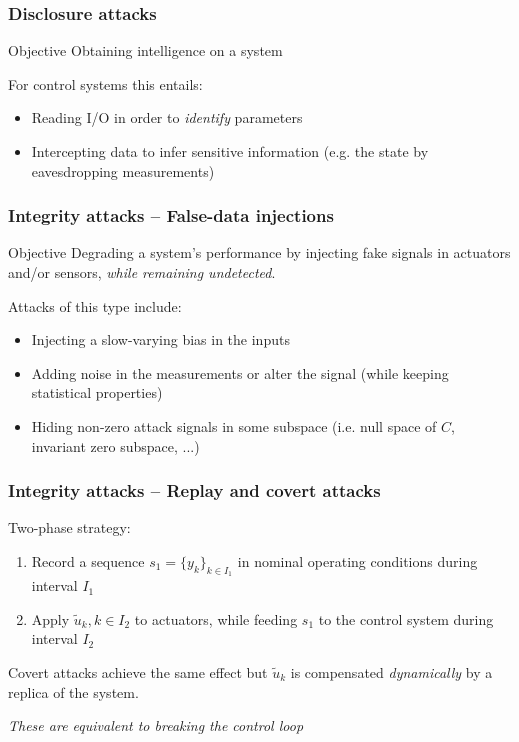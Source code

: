 \documentclass[presentation]{beamer}
\begin{document}
\begin{frame}
	\frametitle{Disclosure attacks}

	\begin{block}{Objective}
		\centering
		Obtaining intelligence on a system
	\end{block}

	\vspace{4ex}
	For control systems this entails:
	\begin{itemize}
		\item Reading I/O in order to \emph{identify} parameters
		\item Intercepting data to infer sensitive information (e.g. the state by eavesdropping measurements)
	\end{itemize}
\end{frame}

\begin{frame}
	\frametitle{Integrity attacks -- False-data injections}

	\begin{block}{Objective}
		\centering
		Degrading a system's performance by injecting fake signals in actuators and/or sensors, \emph{while remaining undetected}.
	\end{block}

	\vfill
	Attacks of this type include:
	\begin{itemize}
		\item Injecting a slow-varying bias in the inputs
		\item Adding noise in the measurements or alter the signal (while keeping statistical properties)
		\item Hiding non-zero attack signals in some subspace (i.e. null space of $C$, invariant zero subspace, ...)
	\end{itemize}
\end{frame}

\begin{frame}
	\frametitle{Integrity attacks -- Replay and covert attacks}

	Two-phase strategy:
	\begin{enumerate}
		\item Record a sequence $s_1 = \{y_k\}_{k \in I_1}$ in nominal operating conditions during interval $I_1$
		\item Apply $\tilde u_k, k \in I_2$ to actuators, while feeding $s_1$ to the control system during interval $I_2$ 
	\end{enumerate}
	
	\vfill
	Covert attacks achieve the same effect but $\tilde u_k$ is compensated \emph{dynamically} by a replica of the system.

	\vfill
	\emph{These are equivalent to breaking the control loop}
\end{frame}
\end{document}
